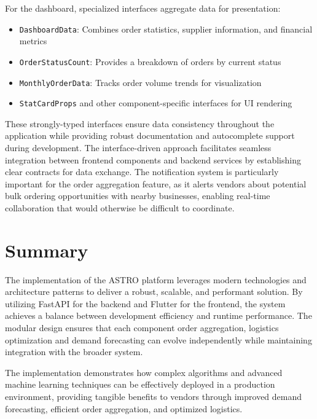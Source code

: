 For the dashboard, specialized interfaces aggregate data for presentation:

\begin{itemize}
    \item \texttt{DashboardData}: Combines order statistics, supplier information, and financial metrics
    \item \texttt{OrderStatusCount}: Provides a breakdown of orders by current status
    \item \texttt{MonthlyOrderData}: Tracks order volume trends for visualization
    \item \texttt{StatCardProps} and other component-specific interfaces for UI rendering
\end{itemize}

These strongly-typed interfaces ensure data consistency throughout the application while providing robust documentation and autocomplete support during development. The interface-driven approach facilitates seamless integration between frontend components and backend services by establishing clear contracts for data exchange.
The notification system is particularly important for the order aggregation feature, as it alerts vendors about potential bulk ordering opportunities with nearby businesses, enabling real-time collaboration that would otherwise be difficult to coordinate.
\section{Summary}

The implementation of the ASTRO platform leverages modern technologies and architecture patterns to deliver a robust, scalable, and performant solution. By utilizing FastAPI for the backend and Flutter for the frontend, the system achieves a balance between development efficiency and runtime performance. The modular design ensures that each component order aggregation, logistics optimization and demand forecasting can evolve independently while maintaining integration with the broader system.

The implementation demonstrates how complex algorithms and advanced machine learning techniques can be effectively deployed in a production environment, providing tangible benefits to vendors through improved demand forecasting, efficient order aggregation, and optimized logistics.